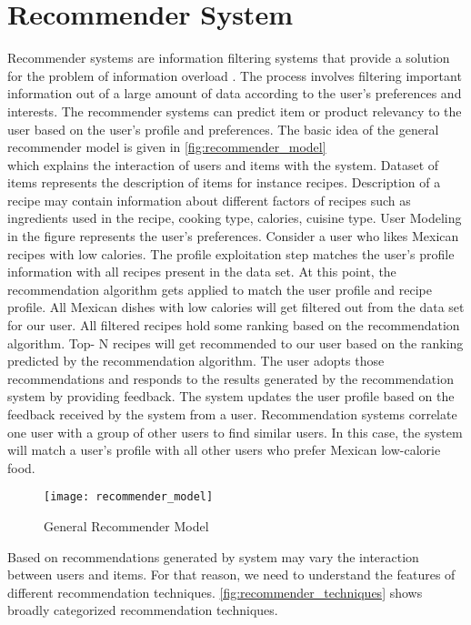 \section{Recommender System}
Recommender systems are information filtering systems that provide a solution for the problem of information overload \cite{45}. The process involves filtering important information out of a large amount of data according to the user's preferences and interests. The recommender systems can predict item or product relevancy to the user based on the user's profile and preferences. The basic idea of the general recommender model is given in \autoref{fig:recommender_model} \\ which explains the interaction of users and items with the system. Dataset of items represents the description of items for instance recipes. Description of a recipe may contain information about different factors of recipes such as ingredients used in the recipe, cooking type, calories, cuisine type. User Modeling in the figure represents the user's preferences. Consider a user who likes Mexican recipes with low calories. The profile exploitation step matches the user's profile information with all recipes present in the data set. At this point, the recommendation algorithm gets applied to match the user profile and recipe profile. All Mexican dishes with low calories will get filtered out from the data set for our user. All filtered recipes hold some ranking based on the recommendation algorithm. Top- N recipes will get recommended to our user based on the ranking predicted by the recommendation algorithm. The user adopts those recommendations and responds to the results generated by the recommendation system by providing feedback. The system updates the user profile based on the feedback received by the system from a user. Recommendation systems correlate one user with a group of other users to find similar users. In this case, the system will match a user's profile with all other users who prefer Mexican low-calorie food. 

\begin{figure}[H]
	\centering
	\texttt{[image: recommender\_model]}
	\caption{General Recommender Model \cite{3}}
	\label{fig:recommender_model}
\end{figure}

\noindent Based on recommendations generated by system may vary the interaction between users and items. For that reason, we need to understand the features of different recommendation techniques. \autoref{fig:recommender_techniques} shows broadly categorized recommendation techniques.

